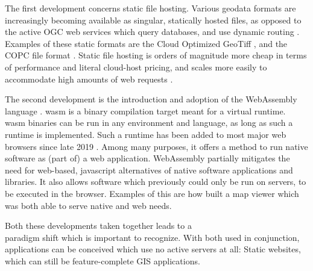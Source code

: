 The first development concerns static file hosting.
Various geodata formats are increasingly becoming available as singular, statically hosted files, 
as opposed to the active \ac{OGC} web services which query databases, and use dynamic routing \citep{open_geospatial_consortium_web_2015}.
Examples of these static formats are the Cloud Optimized GeoTiff \citep{sarago_cloud_2021}, and the COPC file format \citep{bell_cloud_2021}. 
Static file hosting is orders of magnitude more cheap in terms of performance and literal cloud-host pricing, and scales more easily to accommodate high amounts of web requests \citep{sarago_cloud_2021}.

The second development is the introduction and adoption of the WebAssembly language \citep{haas_bringing_2017}. 
\ac{wasm} is a binary compilation target meant for a virtual runtime. 
\ac{wasm} binaries can be run in any environment and language, as long as such a runtime is implemented. 
Such a runtime has been added to most major web browsers since late 2019 \citep{w3c_world_2019}. 
Among many purposes, it offers a method to run native software as (part of) a web application. 
WebAssembly partially mitigates the need for web-based, javascript alternatives of native software applications and libraries. 
It also allows software which previously could only be run on servers, to be executed in the browser. 
Examples of this are how \citet{ammann_maplibre-rs_2022} built a map viewer which was both able to serve native and web needs.


Both these developments taken together leads to a \\
paradigm shift which is important to recognize.
With both used in conjunction, applications can be conceived which use no active servers at all: Static websites, which can still be feature-complete \ac{GIS} applications.




